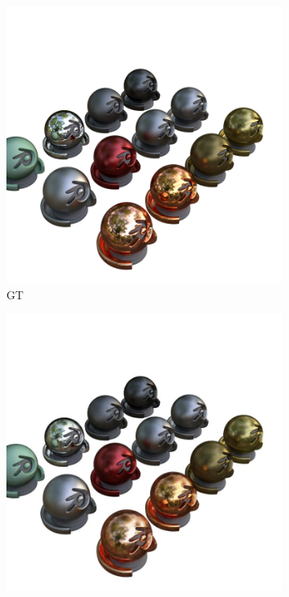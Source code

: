 \documentclass[12pt, a4paper, twoside]{book}
\numberwithin{equation}{chapter}
\numberwithin{theorem}{section}
\numberwithin{definition}{section}
\numberwithin{definitionChapter}{chapter}
\begin{document}
	\begin{figure}[H]
		\centering
		\begin{subfigure}{0.475\textwidth}
			\centering
			\includegraphics[scale=0.25]{img/gt/gt_materials_36.png}
			\caption{GT}
		\end{subfigure}
		\begin{subfigure}{0.475\textwidth}
			\centering
			\includegraphics[scale=0.25]{img/nerf/nerf_materials_36.jpg}

\end{subfigure}
\end{figure}
\end{document}

